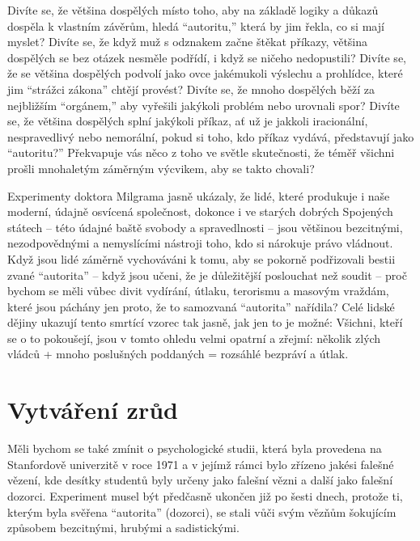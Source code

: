 \documentclass{book}
\begin{document}
Divíte se, že většina dospělých místo toho, aby na základě logiky a důkazů dospěla k vlastním závěrům, hledá \enquote{autoritu,} která by jim řekla, co si mají myslet? Divíte se, že když muž s odznakem začne štěkat příkazy, většina dospělých se bez otázek nesměle podřídí, i když se ničeho nedopustili? Divíte se, že se většina dospělých podvolí jako ovce jakémukoli výslechu a prohlídce, které jim \enquote{strážci zákona} chtějí provést? Divíte se, že mnoho dospělých běží za nejbližším \enquote{orgánem,} aby vyřešili jakýkoli problém nebo urovnali spor? Divíte se, že většina dospělých splní jakýkoli příkaz, ať už je jakkoli iracionální, nespravedlivý nebo nemorální, pokud si toho, kdo příkaz vydává, představují jako \enquote{autoritu?} Překvapuje vás něco z toho ve světle skutečnosti, že téměř všichni prošli mnohaletým záměrným výcvikem, aby se takto chovali?

Experimenty doktora Milgrama jasně ukázaly, že lidé, které produkuje i naše moderní, údajně osvícená společnost, dokonce i ve starých dobrých Spojených státech -- této údajné baště svobody a spravedlnosti -- jsou většinou bezcitnými, nezodpovědnými a nemyslícími nástroji toho, kdo si nárokuje právo vládnout. Když jsou lidé záměrně vychováváni k tomu, aby se pokorně podřizovali bestii zvané \enquote{autorita} -- když jsou učeni, že je důležitější poslouchat než soudit -- proč bychom se měli vůbec divit vydírání, útlaku, terorismu a masovým vraždám, které jsou páchány jen proto, že to samozvaná \enquote{autorita} nařídila? Celé lidské dějiny ukazují tento smrtící vzorec tak jasně, jak jen to je možné: Všichni, kteří se o to pokoušejí, jsou v tomto ohledu velmi opatrní a zřejmí: několik zlých vládců + mnoho poslušných poddaných = rozsáhlé bezpráví a útlak.

\section{Vytváření zrůd}

Měli bychom se také zmínit o psychologické studii, která byla provedena na Stanfordově univerzitě v roce 1971 a v jejímž rámci bylo zřízeno jakési falešné vězení, kde desítky studentů byly určeny jako falešní vězni a další jako falešní dozorci. Experiment musel být předčasně ukončen již po šesti dnech, protože ti, kterým byla svěřena \enquote{autorita} (dozorci), se stali vůči svým vězňům šokujícím způsobem bezcitnými, hrubými a sadistickými.
\end{document}
